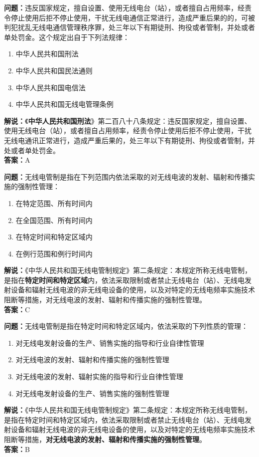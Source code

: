 \documentclass{ctexbook}
\begin{document}
\bigskip


\noindent\textbf{问题：}违反国家规定，擅自设置、使用无线电台（站），或者擅自占用频率，经责令停止使用后拒不停止使用，干扰无线电通信正常进行，造成严重后果的的，可被判犯扰乱无线电通信管理秩序罪，处三年以下有期徒刑、拘役或者管制，并处或者单处罚金。这个规定出自于下列法规律：
\begin{enumerate}[label=\Alph*), leftmargin=3em]
	\item 中华人民共和国刑法
	\item 中华人民共和国民法通则
	\item 中华人民共和国电信法
	\item 中华人民共和国无线电管理条例
\end{enumerate}
\textbf{解说：}《\textbf{中华人民共和国刑法}》第二百八十八条规定：违反国家规定，擅自设置、使用无线电台（站），或者擅自占用频率，经责令停止使用后拒不停止使用，干扰无线电通讯正常进行，造成严重后果的，处三年以下有期徒刑、拘役或者管制，并处或者单处罚金。\\\noindent\textbf{答案：}A


\bigskip


\noindent\textbf{问题：}无线电管制是指在下列范围内依法采取的对无线电波的发射、辐射和传播实施的强制性管理：
\begin{enumerate}[label=\Alph*), leftmargin=3em]
	\item 在特定范围、所有时间内
	\item 在全国范围、所有时间内
	\item 在特定时间和特定区域内
	\item 在例行范围和例行时间内
\end{enumerate}
\noindent\textbf{解说：}《中华人民共和国无线电管制规定》第二条规定：本规定所称无线电管制，是指在\textbf{特定时间和特定区域}内，依法采取限制或者禁止无线电台（站）、无线电发射设备和辐射无线电波的非无线电设备的使用，以及对特定的无线电频率实施技术阻断等措施，对无线电波的发射、辐射和传播实施的强制性管理。\\\noindent\textbf{答案：}C



\bigskip


\noindent\textbf{问题：}无线电管制是指在特定时间和特定区域内，依法采取的下列性质的管理：
\begin{enumerate}[label=\Alph*), leftmargin=3em]
	\item 对无线电发射设备的生产、销售实施的指导和行业自律性管理
	\item 对无线电波的发射、辐射和传播实施的强制性管理
	\item 对无线电波的发射、辐射实施的指导和行业自律性管理
	\item 对无线电发射设备的生产、销售实施的强制性管理
\end{enumerate}
\noindent\textbf{解说：}《中华人民共和国无线电管制规定》第二条规定：本规定所称无线电管制，是指在特定时间和特定区域内，依法采取限制或者禁止无线电台（站）、无线电发射设备和辐射无线电波的非无线电设备的使用，以及对特定的无线电频率实施技术阻断等措施，\textbf{对无线电波的发射、辐射和传播实施的强制性管理}。\\\noindent\textbf{答案：}B
\end{document}
